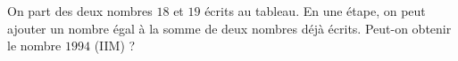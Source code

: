 On part des deux nombres $18$ et $19$ écrits au tableau. En une étape, on peut ajouter un nombre égal à la somme de deux nombres déjà écrits. Peut-on obtenir le nombre $1994$ (IIM) ?
